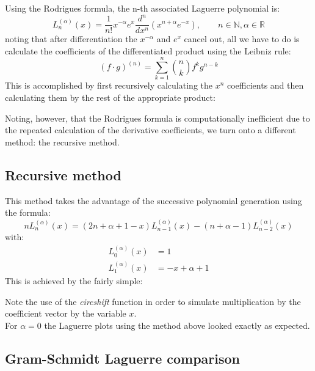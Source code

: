 \documentclass[a4paper]{article}
\numberwithin{equation}{section}
\begin{document}
Using the Rodrigues formula, the n-th associated Laguerre polynomial is:
\begin{equation}
L_n^{(\alpha)}(x)=\frac{1}{n!}x^{-\alpha}e^x\frac{d^n}{dx^n}(x^{n+\alpha}e^{-x}), \quad\quad n \in \mathbb{N}, \alpha \in \mathbb{R}
\end{equation}
noting that after differentiation the $x^{-\alpha}$ and ${e^x}$ cancel out, all we have to do is calculate the coefficients of the differentiated product using the Leibniz rule:
\begin{equation}
(f \cdot g)^{(n)} = \sum_{k=1}^{n} \binom{n}{k} f^k g^{n-k}
\end{equation}
This is accomplished by first recursively calculating the $x^n$ coefficients and then calculating them by the rest of the appropriate product:



\noindent Noting, however, that the Rodrigues formula is computationally inefficient due to the repeated calculation of the derivative coefficients, we turn onto a different method: the recursive method.

\subsection{Recursive method}

This method takes the advantage of the successive polynomial generation using the formula:
\begin{equation}
n L_n^{(\alpha)}(x) = (2n + \alpha + 1 - x) L_{n-1}^{(\alpha)}(x) - (n + \alpha - 1) L_{n-2}^{(\alpha)}(x)
\end{equation}
with:
\begin{align}
L_0^{(\alpha)}(x) &= 1 \\
L_1^{(\alpha)}(x) &= -x+\alpha+1
\end{align}
This is achieved by the fairly simple:


\noindent Note the use of the \textit{circshift} function in order to simulate multiplication by the coefficient vector by the variable $x$.\\
For $\alpha = 0$ the Laguerre plots using the method above looked exactly as expected.

\subsection{Gram-Schmidt Laguerre comparison}
\end{document}
